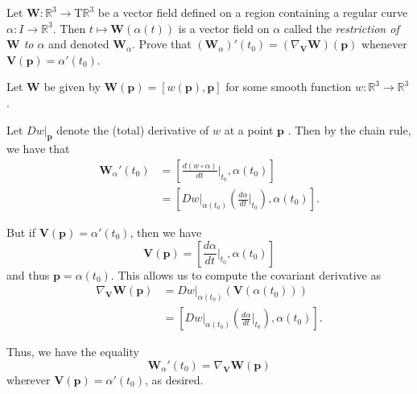 \documentclass[12 pt, letterpaper]{hmcpset}
\begin{document}
\begin{problem}[Problem 1.]
	Let $\mathbf{W} : \mathbb{R}^{3} \to \mathrm{T}\mathbb{R}^{3}$ be a vector field defined on a region containing a regular curve $\alpha : I \to \mathbb{R}^{3}$. Then $t \mapsto \mathbf{W}(\alpha(t))$ is a vector field on $\alpha$ called the \textit{restriction of $\mathbf{W}$ to $\alpha$} and denoted $\mathbf{W}_{\alpha}$. Prove that $(\mathbf{W}_{\alpha})'(t_{0}) = (\nabla_{\mathbf{V}} \mathbf{W})(\mathbf{p})$ whenever $\mathbf{V}(\mathbf{p}) = \alpha'(t_{0})$.
\end{problem}

\begin{solution}
	Let  $\mathbf{W}$  be given by $\mathbf{W}(\mathbf{p}) = [w(\mathbf{p}), \mathbf{p}]$  for some smooth function $w : \mathbb{R}^{3} \to \mathbb{R}^{3}$. 

	Let $D w \Big |_{\mathbf{p}}$  denote the (total) derivative of $w$  at a point $\mathbf{p}$ . Then by the chain rule, we have that
	\[
		\begin{split}
			\mathbf{W}_{\alpha}'(t_{0}) & = \left [\frac{d (w \circ \alpha)}{d t} \Big |_{t_{0}}, \alpha(t_{0}) \right ] \\
						    & = \left [ D w \Big |_{\alpha(t_{0})} \left ( \frac{d \alpha}{d t} \Big |_{t_{0}} \right ), \alpha(t_{0}) \right ].
		\end{split}
	\]
	
	But if $\mathbf{V}(\mathbf{p}) = \alpha'(t_{0})$, then we have
	\[
		\mathbf{V}(\mathbf{p}) = \left [ \frac{d \alpha}{d t} \Big |_{t_{0}}, \alpha(t_{0}) \right ]
	\]
	and thus $\mathbf{p} = \alpha(t_{0})$. This allows us to compute the covariant derivative as
	\[
		\begin{split}
			\nabla_{\mathbf{V}} \mathbf{W}(\mathbf{p}) & = D w \Big |_{\alpha(t_{0})} (\mathbf{V}(\alpha(t_{0}))) \\
								   & = \left [ D w \Big |_{\alpha(t_{0})} \left ( \frac{d \alpha}{d t} \Big |_{t_{0}} \right ), \alpha(t_{0}) \right ].
		\end{split}
	\] 

	Thus, we have the equality
	\[
		\mathbf{W}_{\alpha}'(t_{0}) = \nabla_{\mathbf{V}} \mathbf{W}(\mathbf{p})
	\]
	wherever $\mathbf{V}(\mathbf{p}) = \alpha'(t_{0})$, as desired.
\end{solution}

\pagebreak
\end{document}
